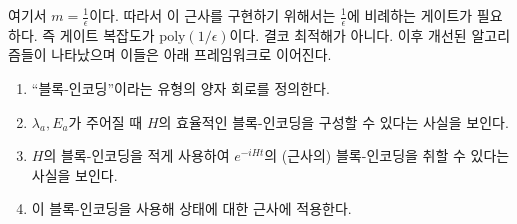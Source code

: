 \documentclass[a4paper,atbegshi,chapter,]{oblivoir}
\begin{document}
여기서 $m=\frac{1}{\epsilon}$이다. 따라서 이 근사를 구현하기 위해서는
$\frac{1}{\epsilon}$에 비례하는 게이트가 필요하다. 즉 게이트 복잡도가 
$\textrm{poly}(1/\epsilon)$이다. 결코 최적해가 아니다. 이후 개선된 알고리즘들이
나타났으며 이들은 아래 프레임워크로 이어진다.
\begin{mdframed}
\begin{enumerate}[label=(\roman*)]
  \item ``블록-인코딩''이라는 유형의 양자 회로를 정의한다.
  \item $\lambda_a, E_a$가 주어질 때 $H$의 효율적인 블록-인코딩을 구성할 수
    있다는 사실을 보인다.
  \item $H$의 블록-인코딩을 적게 사용하여 $e^{-iHt}$의 (근사의) 블록-인코딩을
    취할 수 있다는 사실을 보인다.
  \item 이 블록-인코딩을 사용해 상태에 대한 근사에 적용한다.
\end{enumerate}
\end{mdframed}
\end{document}
